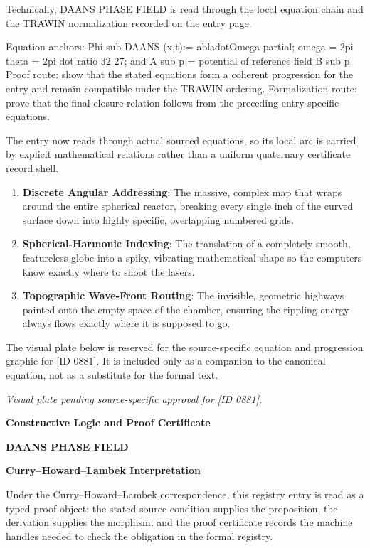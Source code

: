 Technically, DAANS PHASE FIELD is read through the local equation chain and the TRAWIN normalization recorded on the entry page.

Equation anchors: Phi sub DAANS (x,t):= abladotOmega-partial; omega = 2pi theta = 2pi dot ratio 32 27; and A sub p = potential of reference field B sub p. Proof route: show that the stated equations form a coherent progression for the entry and remain compatible under the TRAWIN ordering. Formalization route: prove that the final closure relation follows from the preceding entry-specific equations.

The entry now reads through actual sourced equations, so its local arc is carried by explicit mathematical relations rather than a uniform quaternary certificate record shell.
\endgroup

\begin{enumerate}[leftmargin=1.6em,itemsep=6pt,topsep=4pt]
\item \textbf{Discrete Angular Addressing}: The massive, complex map that wraps around the entire spherical reactor, breaking every single inch of the curved surface down into highly specific, overlapping numbered grids.
\item \textbf{Spherical-Harmonic Indexing}: The translation of a completely smooth, featureless globe into a spiky, vibrating mathematical shape so the computers know exactly where to shoot the lasers.
\item \textbf{Topographic Wave-Front Routing}: The invisible, geometric highways painted onto the empty space of the chamber, ensuring the rippling energy always flows exactly where it is supposed to go.
\end{enumerate}

\begingroup\footnotesize\sloppy
The visual plate below is reserved for the source-specific equation and progression graphic for [ID 0881]. It is included only as a companion to the canonical equation, not as a substitute for the formal text.
\par\endgroup
\begingroup\footnotesize\itshape
Visual plate pending source-specific approval for [ID 0881].
\par\endgroup

\clearpage
\begingroup\tzpsupportsetup
\noindent\textbf{\fontsize{10.8pt}{12.8pt}\selectfont [ID 0881] Constructive Logic and Proof Certificate}\par
\noindent\textbf{\fontsize{10pt}{12pt}\selectfont DAANS PHASE FIELD}\par
\vspace{0.45em}
\begingroup
\footnotesize
\setlength{\parskip}{0.22em}
\setlength{\parindent}{0pt}
\noindent\textbf{Curry--Howard--Lambek Interpretation}\par
Under the Curry--Howard--Lambek correspondence, this registry entry is read as a typed proof
object: the stated source condition supplies the proposition, the derivation supplies the
morphism, and the proof certificate records the machine handles needed to check the obligation
in the formal registry.

